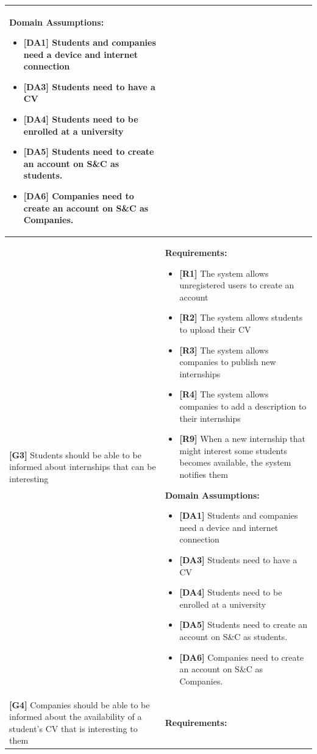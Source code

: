 \begin{longtable}{|p{}|p{}|}
\begin{itemize}
\end{itemize}
\textbf{Domain Assumptions:}
\begin{itemize}
    \item \textbf{[DA1]} Students and companies need a device and internet connection
    \item \textbf{[DA3]} Students need to have a CV
     \item \textbf{[DA4]} Students need to be enrolled at a university
    \item \textbf{[DA5]} Students need to create an account on S\&C as students.
    \item \textbf{[DA6]} Companies need to create an account on S\&C as Companies.
\end{itemize} \\
\hline
\textbf{[G3]} Students should be able to be informed about internships that can be interesting 
& 
\textbf{Requirements:}
\begin{itemize}
    \item \textbf{[R1]} The system allows unregistered users to create an account
    \item \textbf{[R2]} The system allows students to upload their CV
    \item \textbf{[R3]} The system allows companies to publish new internships
    \item \textbf{[R4]} The system allows companies to add a description to their internships
    \item \textbf{[R9]} When a new internship that might interest some students becomes available, the system notifies them
\end{itemize}
\textbf{Domain Assumptions:}
\begin{itemize}
      \item \textbf{[DA1]} Students and companies need a device and internet connection
    \item \textbf{[DA3]} Students need to have a CV
     \item \textbf{[DA4]} Students need to be enrolled at a university
    \item \textbf{[DA5]} Students need to create an account on S\&C as students.
    \item \textbf{[DA6]} Companies need to create an account on S\&C as Companies.
\end{itemize} \\
\hline
\textbf{[G4]} Companies should be able to be informed about the availability of a student's CV that is interesting to them
& 
\textbf{Requirements:}

\end{longtable}
